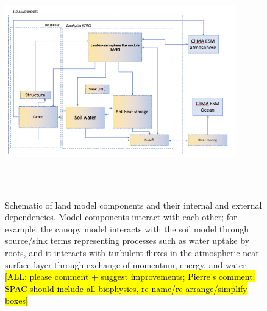 \documentclass[twoside,10pt]{report}
\begin{document}
\begin{figure}[htb]
\includegraphics[width=10cm,height=10cm,keepaspectratio]{CLIMA-land/LM_figures/JPLCLIMA_LM_DESIGN_20191115.png}
\caption{Schematic of land model components and their internal and external dependencies. Model components interact with each other; for example, the canopy model interacts with the soil model through source/sink terms representing processes such as water uptake by roots, and it interacts with turbulent fluxes in the atmospheric near-surface layer through exchange of momentum, energy, and water. \hl{[ALL: please comment + suggest improvements; Pierre's comment: SPAC should include all biophysics, re-name/re-arrange/simplify boxes]}}
\label{f:land_model_schematic}
\end{figure}
\end{document}

